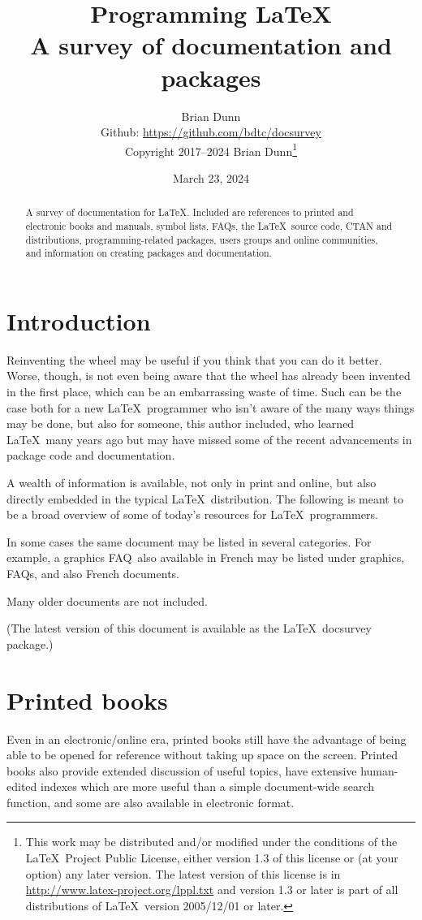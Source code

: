 \documentclass{article}
\title{Programming \LaTeX\Dash \\ A survey of documentation and packages}
\author{Brian Dunn \\
	\small Github: \url{https://github.com/bdtc/docsurvey} \\
	\small Copyright 2017--2024 Brian Dunn\thanks{
		This work may be distributed and/or modified under the
		conditions of the \LaTeX\ Project Public License, either version 1.3
		of this license or (at your option) any later version.
		The latest version of this license is in
		\url{http://www.latex-project.org/lppl.txt}
		and version 1.3 or later is part of all distributions of \LaTeX\
		version 2005/12/01 or later.
	}
}
\date{March 23, 2024}
\def\FAQ{\acro{FAQ}}
\newcommand{\acro}[1]{\textsc{\MakeLowercase{#1}}}
\def\pkg#1{#1}%
\def\LaTeX{LaTeX}%
\def\acro#1{#1}%
\renewcommand*{\pkg}[1]{#1}
\renewcommand*{\LaTeX}{LaTeX}
\begin{document}
\maketitle


\thispagestyle{empty}

\begin{abstract}
\noindent
A survey of documentation for \LaTeX.
Included are references to printed and electronic books and manuals,
symbol lists, \FAQ{}s, the \LaTeX\ source code, CTAN and distributions,
programming-related packages, users groups and online communities,
and information on creating packages and documentation.
\end{abstract}


\tableofcontents


\section{Introduction}

Reinventing the wheel may be useful if you think that you can do it better.
Worse, though, is not even being aware that the wheel has already been
invented in the first place, which can be an embarrassing waste of time.
Such can be the case both for a new \LaTeX\ programmer who isn't aware of
the many ways things may be done, but also for someone, this author included,
who learned \LaTeX\ many years ago but may have missed some of the recent
advancements in package code and documentation.

A wealth of information is available, not only in print and online,
but also directly embedded in the typical \LaTeX\ distribution.
The following is meant to be a broad overview of some of today's resources
for \LaTeX\ programmers.

In some cases the same document may be listed in several categories.
For example, a graphics \FAQ\ also available in French may be listed under
graphics, \FAQ{}s, and also French documents.

Many older documents are not included.

(The latest version of this document is available as the \LaTeX\ \pkg{docsurvey} package.)


\section{Printed books}

Even in an electronic/online era, printed books still have the advantage
of being able to be opened for reference without taking up space
on the screen.  Printed books also provide extended discussion of
useful topics, have extensive human-edited indexes which are more useful
than a simple document-wide search function, and some are also available in
electronic format.
\end{document}
